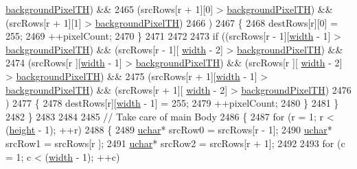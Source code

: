 \begin{DoxyCode}
      \hyperlink{class_k_k_b_1_1_raster_a3c4e96eaf48274f5d8912617f81f2a0b}{backgroundPixelTH})  &&
2465            (srcRows[r + 1][0] > \hyperlink{class_k_k_b_1_1_raster_a3c4e96eaf48274f5d8912617f81f2a0b}{backgroundPixelTH})  &&  (srcRows[r + 1][1] > 
      \hyperlink{class_k_k_b_1_1_raster_a3c4e96eaf48274f5d8912617f81f2a0b}{backgroundPixelTH})
2466           )
2467       \{
2468         destRows[r][0] = 255;
2469         ++pixelCount;
2470       \}
2471 
2472 
2473       \textcolor{keywordflow}{if}  ((srcRows[r - 1][\hyperlink{class_k_k_b_1_1_raster_ae0bcc103e191c3421d7692dc69ceb554}{width} - 1] > \hyperlink{class_k_k_b_1_1_raster_a3c4e96eaf48274f5d8912617f81f2a0b}{backgroundPixelTH})  &&  (srcRows[r - 1][
      \hyperlink{class_k_k_b_1_1_raster_ae0bcc103e191c3421d7692dc69ceb554}{width} - 2] > \hyperlink{class_k_k_b_1_1_raster_a3c4e96eaf48274f5d8912617f81f2a0b}{backgroundPixelTH})  &&
2474            (srcRows[r    ][\hyperlink{class_k_k_b_1_1_raster_ae0bcc103e191c3421d7692dc69ceb554}{width} - 1] > \hyperlink{class_k_k_b_1_1_raster_a3c4e96eaf48274f5d8912617f81f2a0b}{backgroundPixelTH})  &&  (srcRows[r    ][
      \hyperlink{class_k_k_b_1_1_raster_ae0bcc103e191c3421d7692dc69ceb554}{width} - 2] > \hyperlink{class_k_k_b_1_1_raster_a3c4e96eaf48274f5d8912617f81f2a0b}{backgroundPixelTH})  &&
2475            (srcRows[r + 1][\hyperlink{class_k_k_b_1_1_raster_ae0bcc103e191c3421d7692dc69ceb554}{width} - 1] > \hyperlink{class_k_k_b_1_1_raster_a3c4e96eaf48274f5d8912617f81f2a0b}{backgroundPixelTH})  &&  (srcRows[r + 1][
      \hyperlink{class_k_k_b_1_1_raster_ae0bcc103e191c3421d7692dc69ceb554}{width} - 2] > \hyperlink{class_k_k_b_1_1_raster_a3c4e96eaf48274f5d8912617f81f2a0b}{backgroundPixelTH})
2476           )
2477       \{
2478         destRows[r][\hyperlink{class_k_k_b_1_1_raster_ae0bcc103e191c3421d7692dc69ceb554}{width} - 1] = 255;
2479         ++pixelCount;
2480       \}
2481     \}
2482   \}
2483 
2484 
2485   \textcolor{comment}{// Take care of main Body}
2486   \{
2487     \textcolor{keywordflow}{for}  (r = 1;  r < (\hyperlink{class_k_k_b_1_1_raster_af39ff189de4fbb6de98392e187efafb7}{height} - 1);  ++r)
2488     \{
2489       \hyperlink{namespace_k_k_b_ace9969169bf514f9ee6185186949cdf7}{uchar}*  srcRow0 = srcRows[r - 1];
2490       \hyperlink{namespace_k_k_b_ace9969169bf514f9ee6185186949cdf7}{uchar}*  srcRow1 = srcRows[r    ];
2491       \hyperlink{namespace_k_k_b_ace9969169bf514f9ee6185186949cdf7}{uchar}*  srcRow2 = srcRows[r + 1];
2492 
2493       \textcolor{keywordflow}{for}  (c = 1;  c < (\hyperlink{class_k_k_b_1_1_raster_ae0bcc103e191c3421d7692dc69ceb554}{width} - 1);  ++c)

\end{DoxyCode}

